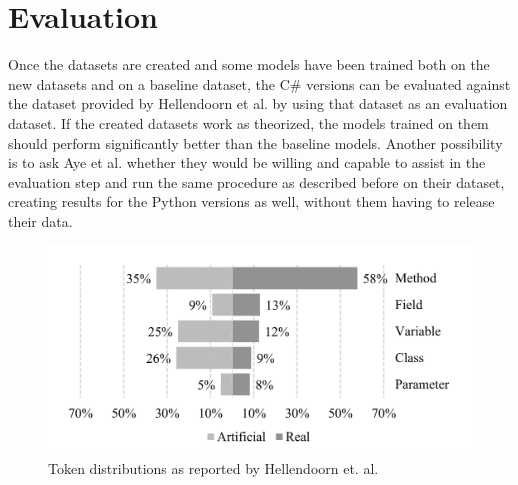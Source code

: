\documentclass[sigplan,screen,9pt]{acmart}
\begin{document}
\section{Evaluation}
Once the datasets are created and some models have been trained both on the
new datasets
and on a baseline dataset, the C\# versions can be evaluated against the dataset provided by Hellendoorn et al.\cite{8812116} by using that dataset as an evaluation dataset.
If the created datasets work as theorized, the models trained on them should perform significantly better than the baseline models.
Another possibility is to ask Aye et al. whether they would be willing and capable to assist in the evaluation step and run the same procedure as described before on their dataset, creating results for the Python versions as well, without them having to release their data.


\begin{figure}
    \centering
    \includegraphics[scale = 0.1]{token-distribution.png}
    \caption{Token distributions as reported by Hellendoorn et. al.\cite{8812116}}

    \label{fig:distributions}
\end{figure}







\end{document}
